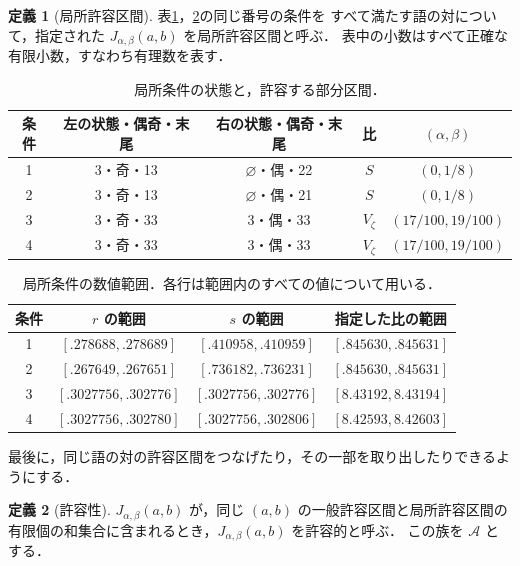 \documentclass[11pt,a4paper]{article}
\theoremstyle{definition}
\newtheorem{definition}{定義}
\newcommand{\eps}{\varnothing}
\newcommand{\A}{\mathcal A}
\begin{document}
\begin{definition}[局所許容区間]\label{def:local}
表\ref{tab:local-states}，\ref{tab:local-boxes}の同じ番号の条件を
すべて満たす語の対について，指定された $J_{\alpha,\beta}(a,b)$ を局所許容区間と呼ぶ．
表中の小数はすべて正確な有限小数，すなわち有理数を表す．
\end{definition}

\begin{table}[htbp]
\centering\small
\begin{tabular}{ccccc}
\toprule
条件 & 左の状態・偶奇・末尾 & 右の状態・偶奇・末尾 & 比 & $(\alpha,\beta)$\\
\midrule
1 & $3$・奇・13 & $\eps$・偶・22 & $S$ & $(0,1/8)$\\
2 & $3$・奇・13 & $\eps$・偶・21 & $S$ & $(0,1/8)$\\
3 & $3$・奇・33 & $3$・偶・33 & $V_\zeta$ & $(17/100,19/100)$\\
4 & $3$・奇・33 & $3$・偶・33 & $V_\zeta$ & $(17/100,19/100)$\\
\bottomrule
\end{tabular}
\caption{局所条件の状態と，許容する部分区間．}\label{tab:local-states}
\end{table}
\begin{table}[htbp]
\centering\small
\begin{tabular}{cccc}
\toprule
条件 & $r$ の範囲 & $s$ の範囲 & 指定した比の範囲\\
\midrule
1 & $[.278688,.278689]$ & $[.410958,.410959]$ & $[.845630,.845631]$\\
2 & $[.267649,.267651]$ & $[.736182,.736231]$ & $[.845630,.845631]$\\
3 & $[.3027756,.302776]$ & $[.3027756,.302776]$ & $[8.43192,8.43194]$\\
4 & $[.3027756,.302780]$ & $[.3027756,.302806]$ & $[8.42593,8.42603]$\\
\bottomrule
\end{tabular}
\caption{局所条件の数値範囲．各行は範囲内のすべての値について用いる．}
\label{tab:local-boxes}
\end{table}

最後に，同じ語の対の許容区間をつなげたり，その一部を取り出したりできるようにする．
\begin{definition}[許容性]\label{def:admissible}
$J_{\alpha,\beta}(a,b)$ が，同じ $(a,b)$ の一般許容区間と局所許容区間の
有限個の和集合に含まれるとき，$J_{\alpha,\beta}(a,b)$ を許容的と呼ぶ．
この族を $\A$ とする．
\end{definition}
\end{document}
